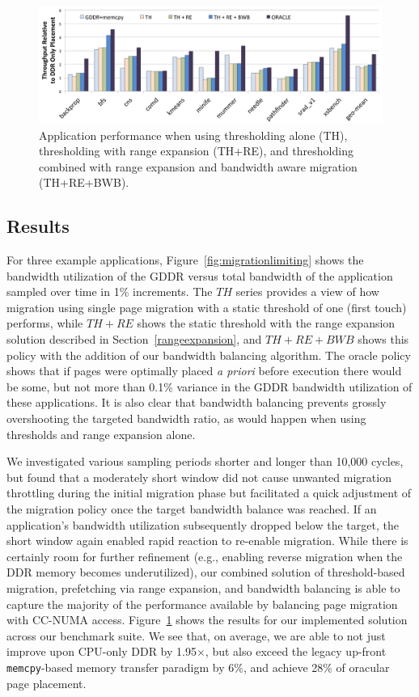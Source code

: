 \begin{figure}[thp]
    \includegraphics[width=\textwidth]{hpca2015/figures/final.png}
    \caption{Application performance when using thresholding alone (TH), thresholding with range expansion (TH+RE), and thresholding combined with range expansion and bandwidth aware migration (TH+RE+BWB).}
    \label{fig:final}
\end{figure}

\subsection{Results}
For three example applications, Figure~\ref{fig:migrationlimiting} 
shows the bandwidth utilization of the GDDR versus total bandwidth of the application sampled over time
in 1\% increments.  The $TH$ series provides a view of how migration using single page
migration with a static threshold of one (first touch) performs, while $TH+RE$ shows the static threshold with the range expansion
solution described in Section~\ref{rangeexpansion}, and $TH+RE+BWB$ shows this policy with the addition of our
bandwidth balancing algorithm.  The oracle policy shows that if pages were optimally placed \emph{a priori} before execution there would be some,
but not more than 0.1\% variance in the GDDR bandwidth utilization of these applications.  It is also clear that
bandwidth balancing prevents grossly overshooting the targeted bandwidth ratio, as would happen when using thresholds and range expansion alone.

We investigated various sampling periods shorter and longer than 10,000 cycles, but
found that a moderately short window did not cause unwanted migration throttling during the initial
migration phase but facilitated a quick adjustment of the migration policy once the target bandwidth balance was reached.
If an application's bandwidth utilization subsequently dropped below the target, the short window again enabled rapid
reaction to re-enable migration.   While there is certainly room for further refinement (e.g., enabling 
reverse migration when the DDR memory becomes underutilized), our combined solution of threshold-based migration, prefetching via range expansion, and bandwidth balancing is able to capture the majority of the performance available by balancing page migration
with CC-NUMA access.  Figure~\ref{fig:final} shows the results for our implemented solution across
our benchmark suite.  We see that, on average, we are able to not just improve
upon CPU-only DDR by 1.95$\times$,
but also exceed the legacy up-front {\tt memcpy}-based memory transfer paradigm by 6\%,
and achieve 28\% of oracular page placement.

